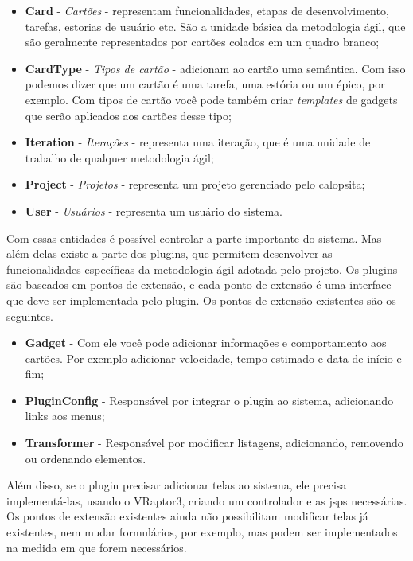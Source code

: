 \begin{itemize}
	\item{\textbf{Card} - \textit{Cartões} - representam funcionalidades, etapas de desenvolvimento, tarefas, estorias de usuário etc. São a unidade básica da metodologia ágil, que são geralmente representados por cartões colados em um quadro branco;}
	\item{\textbf{CardType} - \textit{Tipos de cartão} - adicionam ao cartão uma semântica. Com isso podemos dizer que um cartão é uma tarefa, uma estória ou um épico, por exemplo. Com tipos de cartão você pode também criar \textit{templates} de gadgets que serão aplicados aos cartões desse tipo;}
	\item{\textbf{Iteration} - \textit{Iterações} - representa uma iteração, que é uma unidade de trabalho de qualquer metodologia ágil;}
	\item{\textbf{Project} - \textit{Projetos} - representa um projeto gerenciado pelo calopsita;}
	\item{\textbf{User} - \textit{Usuários} - representa um usuário do sistema.}
\end{itemize}

Com essas entidades é possível controlar a parte importante do sistema. Mas além delas existe a parte dos plugins, que permitem desenvolver as funcionalidades específicas da metodologia ágil adotada pelo projeto. Os plugins são baseados em pontos de extensão, e cada ponto de extensão é uma interface que deve ser implementada pelo plugin. Os pontos de extensão existentes são os seguintes.

\begin{itemize}
	\item{\textbf{Gadget} - Com ele você pode adicionar informações e comportamento aos cartões. Por exemplo adicionar velocidade, tempo estimado e data de início e fim;}
	\item{\textbf{PluginConfig} - Responsável por integrar o plugin ao sistema, adicionando links aos menus;}
	\item{\textbf{Transformer} - Responsável por modificar listagens, adicionando, removendo ou ordenando elementos.}
\end{itemize}

Além disso, se o plugin precisar adicionar telas ao sistema, ele precisa implementá-las, usando o VRaptor3, criando um controlador e as jsps necessárias. Os pontos de extensão existentes ainda não possibilitam modificar telas já existentes, nem mudar formulários, por exemplo, mas podem ser implementados na medida em que forem necessários.

